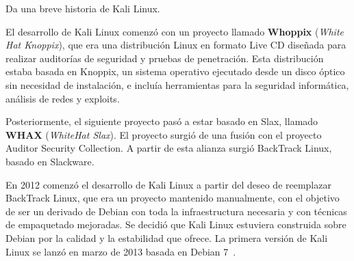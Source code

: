 Da una breve historia de Kali Linux.

El desarrollo de Kali Linux comenzó con un proyecto llamado \textbf{Whoppix} (\textit{White Hat Knoppix}), que era una distribución Linux en formato Live CD diseñada para realizar auditorías de seguridad y pruebas de penetración. Esta distribución estaba basada en Knoppix, un sistema operativo ejecutado desde un disco óptico sin necesidad de instalación, e incluía herramientas para la seguridad informática, análisis de redes y exploits.

Posteriormente, el siguiente proyecto pasó a estar basado en Slax, llamado \textbf{WHAX} (\textit{WhiteHat Slax}). El proyecto surgió de una fusión con el proyecto Auditor Security Collection. A partir de esta alianza surgió BackTrack Linux, basado en Slackware. 

En 2012 comenzó el desarrollo de Kali Linux a partir del deseo de reemplazar BackTrack Linux, que era un proyecto mantenido manualmente, con el objetivo de ser un derivado de Debian con toda la infraestructura necesaria y con técnicas de empaquetado mejoradas. Se decidió que Kali Linux estuviera construida sobre Debian por la calidad y la estabilidad que ofrece. La primera versión de Kali Linux se lanzó en marzo de 2013 basada en Debian 7~\cite{debstory}.
